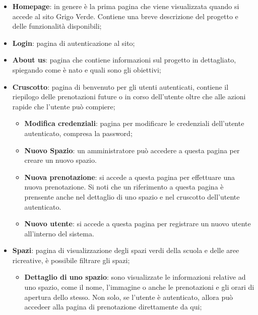 \begin{itemize}
	\item \textbf{Homepage}: in genere è la prima pagina che viene visualizzata
	      quando si accede al sito Grigo Verde. Contiene una breve descrizione
	      del progetto e delle funzionalità disponibili;

	\item \textbf{Login}: pagina di autenticazione al sito;

	\item \textbf{About us}: pagina che contiene informazioni sul progetto in
	      dettagliato, spiegando come è nato e quali sono gli obiettivi;

	\item \textbf{Cruscotto}: pagina di benvenuto per gli utenti autenticati,
	      contiene il riepilogo delle prenotazioni future o in corso dell'utente
	      oltre che alle azioni rapide che l'utente può compiere;

	      \begin{itemize}
		      \item \textbf{Modifica credenziali}: pagina per modificare le
		            credenziali dell'utente autenticato, compresa la password;

		      \item \textbf{Nuovo Spazio}: un amministratore può accedere a
		            questa pagina per creare un nuovo spazio.

		      \item \textbf{Nuova prenotazione}: si accede a questa pagina per
		            effettuare una nuova prenotazione. Si noti che un
		            riferimento a questa pagina è prensente anche nel dettaglio
		            di uno spazio e nel cruscotto dell'utente autenticato.

		      \item \textbf{Nuovo utente}: si accede a questa pagina per
		            registrare un nuovo utente all'interno del sistema.
	      \end{itemize}

	\item \textbf{Spazi}: pagina di visualizzazione degli spazi verdi della
	      scuola e delle aree ricreative, è possibile filtrare gli spazi;

	      \begin{itemize}
		      \item \textbf{Dettaglio di uno spazio}: sono visualizzate le
		            informazioni relative ad uno spazio, come il nome,
		            l'immagine o anche le prenotazioni e gli orari di apertura
		            dello stesso. Non solo, se l'utente è autenticato, allora
		            può accedeer alla pagina di prenotazione direttamente da
		            qui;


\end{itemize}
\end{itemize}
